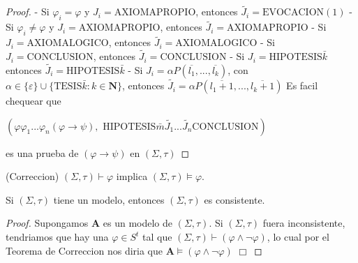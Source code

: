 \begin{proof}
    - Si \(\varphi _{i}=\varphi \) y \(J_{i}=\mathrm{AXIOMAPROPIO}\), entonces \(\widetilde{J_{i}}=\mathrm{EVOCACION}(1)\)
    - Si \(\varphi _{i}\neq \varphi \) y \(J_{i}=\mathrm{AXIOMAPROPIO}\), entonces \(\widetilde{J_{i}}=\mathrm{AXIOMAPROPIO}\)
    - Si \(J_{i}=\mathrm{AXIOMALOGICO}\), entonces \(\widetilde{J_{i}}= \mathrm{AXIOMALOGICO}\)
    - Si \(J_{i}=\mathrm{CONCLUSION}\), entonces \(\widetilde{J_{i}}=\mathrm{ CONCLUSION}\)
    - Si \(J_{i}=\mathrm{HIPOTESIS}\bar{k}\) entonces \(\widetilde{J_{i}}= \mathrm{HIPOTESIS}\bar{k}\)
    - Si \(J_{i}=\alpha P(\overline{l_{1}},...,\overline{l_{k}})\), con \( \alpha \in \{\varepsilon \}\cup \{\mathrm{TESIS}\bar{k}:k\in \mathbf{N}\}\), entonces \(\widetilde{J_{i}}=\alpha P(\overline{l_{1}+1},...,\overline{l_{k}+1 })\)
    Es facil chequear que

    \(\displaystyle (\varphi \varphi _{1}...\varphi _{n}(\varphi \rightarrow \psi ),\text{ HIPOTESIS}\bar{m}\widetilde{J_{1}}...\widetilde{J_{n}}\text{CONCLUSION}) \)

    es una prueba de \((\varphi \rightarrow \psi )\) en \((\Sigma ,\tau )\)
  \end{proof}

  \begin{theorem}
    (Correccion) \((\Sigma ,\tau )\vdash \varphi \) implica \((\Sigma ,\tau )\models \varphi .\)
  \end{theorem}

  \begin{corollary}
    Si \((\Sigma ,\tau )\) tiene un modelo, entonces \((\Sigma ,\tau )\) es consistente.
  \end{corollary}
  \begin{proof}
    Supongamos \(\mathbf{A}\) es un modelo de \((\Sigma ,\tau ).\) Si \((\Sigma ,\tau )\) fuera inconsistente, tendriamos que hay una \(\varphi \in S^{t}\) tal que \( (\Sigma ,\tau )\vdash (\varphi \wedge \lnot \varphi )\), lo cual por el Teorema de Correccion nos diria que \(\mathbf{A}\models (\varphi \wedge \lnot \varphi )\) \(\Box\)
  \end{proof}

